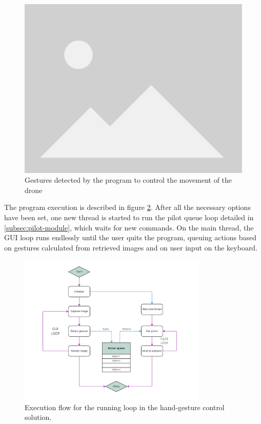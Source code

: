 \begin{figure}
  \centering
  \includegraphics[width=\textwidth, keepaspectratio]{img/placeholder.png}
  \caption{Gestures detected by the program to control the movement of the drone}
  \label{fig:hand-gestures}
\end{figure}


The program execution is described in figure \ref{fig:hands-loop}.
After all the necessary options have been set, one new thread is started to run the pilot queue loop detailed in \ref{subsec:pilot-module}, which waits for new commands.
On the main thread, the GUI loop runs endlessly until the user quits the program, queuing actions based on gestures calculated from retrieved images and on user input on the keyboard.
\begin{figure}
  \centering
  \includegraphics[width=0.8\textwidth, keepaspectratio]{img/hand-loop.jpg}
  \caption{Execution flow for the running loop in the hand-gesture control solution.}
  \label{fig:hands-loop}
\end{figure}






